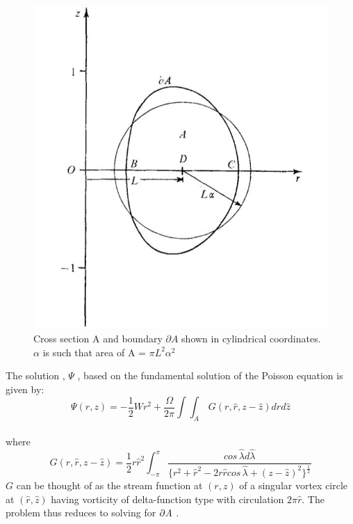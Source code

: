 \documentclass[10pt,a4paper,final]{report}
\begin{document}
\begin{figure}

\includegraphics[scale=0.5]{shape.jpg}
\caption{Cross section A and boundary $\partial A$ shown in cylindrical coordinates. $\alpha$ is such that area of A = $\pi L^2 \alpha^2$}

\end{figure}

The solution , $\Psi$ , based on the fundamental solution of the Poisson equation is given by:
\\
\begin{equation}
	\Psi(r, z) = -\frac{1}{2}Wr^2 + 
	\frac{\Omega}{2\pi}\int \int_A \, 
	G(r, \hat{r}, z - \hat{z}) d\hat{r}d\hat{z}
\end{equation}
\\
where
\\
\begin{equation}
G(r, \hat{r}, z - \hat{z}) = \frac{1}{2} r \hat{r}^2 
\int_{-\pi}^{\pi} \frac{cos\, \hat{\lambda} d\hat{\lambda}}
{\lbrace r^2 + \hat{r}^2 - 2r\hat{r}cos\,\hat{\lambda} 
+ (z-\hat{z})^2 \rbrace^{\frac{1}{2}}}
\end{equation}
$G$ can be thought of as the stream function at $(r,z)$ of a singular vortex circle at $(\hat{r},\hat{z})$ having vorticity of delta-function type with circulation $2\pi\hat{r}$.
The problem thus reduces to solving for $\partial \emph{A}$ .
\\
\end{document}
